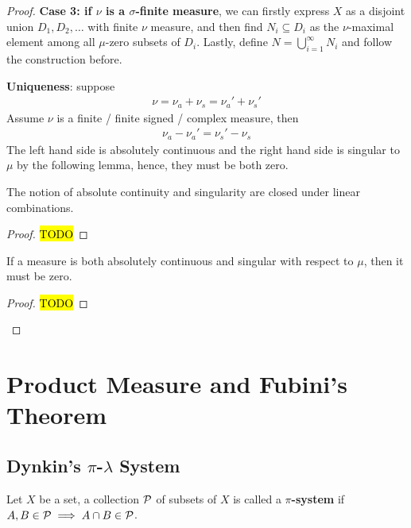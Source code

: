 \documentclass[11pt]{article}
\begin{document}
\begin{theorem}
\begin{proof}
			\textbf{Case 3: if $\nu$ is a $\sigma$-finite measure}, we can firstly express $X$ as a disjoint union $D_1, D_2, \dots$  with finite $\nu$ measure, and then find $N_i \subseteq D_i$ as the $\nu$-maximal element among all $\mu$-zero subsets of $D_i$.
			Lastly, define $N = \bigcup_{i=1}^\infty N_i$ and follow the construction before.
			
			\textbf{Uniqueness}: suppose
			\begin{align}
				\nu = \nu_a + \nu_s = \nu_a' + \nu_s'
			\end{align}
			Assume $\nu$ is a finite / finite signed / complex measure, then
			\begin{align}
				\nu_a - \nu_a' = \nu_s' - \nu_s
			\end{align}
			The left hand side is absolutely continuous and the right hand side is singular to $\mu$ by the following lemma, hence, they must be both zero.
			\begin{tcolorbox}
			\begin{lemma}
				The notion of absolute continuity and singularity are closed under linear combinations.
			\end{lemma}
			\begin{proof}
				\hl{TODO}
			\end{proof}
			\end{tcolorbox}
			\begin{tcolorbox}
			\begin{lemma}
				If a measure is both absolutely continuous and singular with respect to $\mu$, then it must be zero.
			\end{lemma}
			\begin{proof}
				\hl{TODO}
			\end{proof}
			\end{tcolorbox}
		\end{proof}
	\end{theorem}
	
	\section{Product Measure and Fubini's Theorem}
	\subsection{Dynkin's $\pi$-$\lambda$ System}
	\begin{definition}
		Let $X$ be a set, a collection $\mathcal{{P}}$ of subsets of $X$ is called a \textbf{$\pi$-system} if $A, B \in \mathcal{{P}} \implies A \cap B \in \mathcal{{P}}$.
	\end{definition}
	
\end{document}

